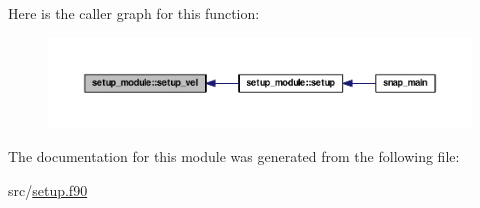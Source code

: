 Here is the caller graph for this function\-:\nopagebreak
\begin{figure}[H]
\begin{center}
\leavevmode
\includegraphics[width=350pt]{classsetup__module_a1ca835a5c592e2d2084252cc3fb7c19b_icgraph}
\end{center}
\end{figure}




The documentation for this module was generated from the following file\-:\begin{DoxyCompactItemize}
\item 
src/\hyperlink{setup_8f90}{setup.\-f90}\end{DoxyCompactItemize}
